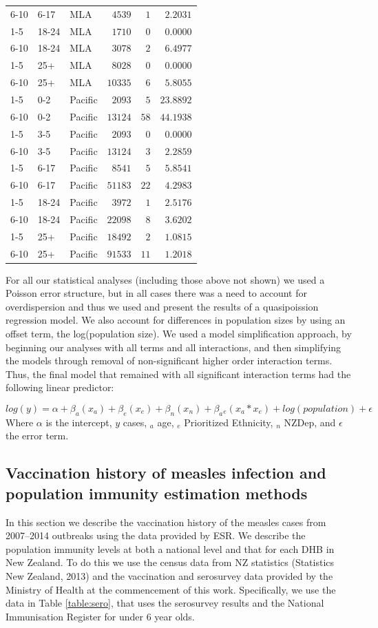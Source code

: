 \documentclass{article}
\begin{document}
\begin{table}[hbtp]
\begin{center}
\begin{tabular}{lllrrr}
6-10&6-17&MLA&$   4539$&$  1$&$ 2.2031$\tabularnewline
1-5&18-24&MLA&$   1710$&$  0$&$ 0.0000$\tabularnewline
6-10&18-24&MLA&$   3078$&$  2$&$ 6.4977$\tabularnewline
1-5&25+&MLA&$   8028$&$  0$&$ 0.0000$\tabularnewline
6-10&25+&MLA&$  10335$&$  6$&$ 5.8055$\tabularnewline
1-5&0-2&Pacific&$   2093$&$  5$&$23.8892$\tabularnewline
6-10&0-2&Pacific&$  13124$&$ 58$&$44.1938$\tabularnewline
1-5&3-5&Pacific&$   2093$&$  0$&$ 0.0000$\tabularnewline
6-10&3-5&Pacific&$  13124$&$  3$&$ 2.2859$\tabularnewline
1-5&6-17&Pacific&$   8541$&$  5$&$ 5.8541$\tabularnewline
6-10&6-17&Pacific&$  51183$&$ 22$&$ 4.2983$\tabularnewline
1-5&18-24&Pacific&$   3972$&$  1$&$ 2.5176$\tabularnewline
6-10&18-24&Pacific&$  22098$&$  8$&$ 3.6202$\tabularnewline
1-5&25+&Pacific&$  18492$&$  2$&$ 1.0815$\tabularnewline
6-10&25+&Pacific&$  91533$&$ 11$&$ 1.2018$\tabularnewline
\hline
\end{tabular}\end{center}\label{table:percap}
\end{table}

For all our statistical analyses (including those above not shown) we used a Poisson error structure, but in all cases there was a need to account for overdispersion and thus we used and present the results of a quasipoission regression model. We also account for differences in population sizes by using an offset term, the log(population size). We used a model simplification approach, by beginning our analyses with all terms and all interactions, and then simplifying the models through removal of non-significant higher order interaction terms. Thus, the final model that remained with all significant interaction terms had the following linear predictor:

\begin{equation} \label{eq:reg}
 log(y) = \alpha + \beta _a (x_a)+ \beta _e(x_e)+ \beta _n (x_n) + \beta _a{}_e(x_a * x_e)+ log(population)  + \epsilon
  \end{equation}
Where $\alpha$ is the intercept, $y$ cases, $_a$ age, $_e$ Prioritized Ethnicity, $_n$ NZDep, and $\epsilon$ the error term.



\subsection{Vaccination history of measles infection and population immunity estimation methods}
\label{sub:immunestat}

In this section we describe the vaccination history of the measles cases from 2007--2014 outbreaks using the data provided by ESR. We describe the population immunity levels at both a national level and that for each DHB in New Zealand. To do this we use the census data from NZ statistics (Statistics New Zealand, 2013) and the vaccination and serosurvey data provided by the Ministry of Health at the commencement of this work. Specifically, we use the data in Table \ref{table:sero}, that uses the serosurvey results and the National Immunisation Register for under 6 year olds.
\end{document}
